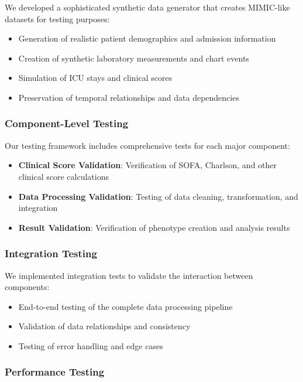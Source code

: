 \documentclass[12pt]{article}
\begin{document}
We developed a sophisticated synthetic data generator that creates MIMIC-like datasets for testing purposes:
\begin{itemize}
    \item Generation of realistic patient demographics and admission information
    \item Creation of synthetic laboratory measurements and chart events
    \item Simulation of ICU stays and clinical scores
    \item Preservation of temporal relationships and data dependencies
\end{itemize}

\subsubsection{Component-Level Testing}

Our testing framework includes comprehensive tests for each major component:
\begin{itemize}
    \item \textbf{Clinical Score Validation}: Verification of SOFA, Charlson, and other clinical score calculations
    \item \textbf{Data Processing Validation}: Testing of data cleaning, transformation, and integration
    \item \textbf{Result Validation}: Verification of phenotype creation and analysis results
\end{itemize}

\subsubsection{Integration Testing}

We implemented integration tests to validate the interaction between components:
\begin{itemize}
    \item End-to-end testing of the complete data processing pipeline
    \item Validation of data relationships and consistency
    \item Testing of error handling and edge cases
\end{itemize}

\subsubsection{Performance Testing}
\end{document}
